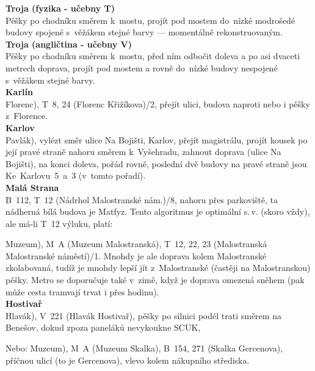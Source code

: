 \textbf{Troja (fyzika - učebny T)}\\
Pěšky po chodníku směrem k~mostu, projít
pod mostem do~nízké modrošedé budovy spojené s~věžákem stejné
barvy --- momentálně rekonstruovaným.
\\
\textbf{Troja (angličtina - učebny V)}\\
Pěšky po chodníku směrem k~mostu, před
ním odbočit doleva a po asi dvaceti metrech doprava, projít pod
mostem a rovně do~nízké budovy nespojené s~věžákem stejné barvy.
\\
\textbf{Karlín}\\
\startpath Florenc), T~8, 24 (Florenc \ra
Křižíkova)/2, přejít ulici, budova naproti nebo i pěšky
z~Florence.\\
\textbf{Karlov} \\
\startpath Pavlák), vylézt směr ulice Na Bojišti,
Karlov, přejít magistrálu, projít kousek po její pravé straně
nahoru směrem k~Vyšehradu, zahnout doprava (ulice Na Bojišti), na
konci doleva, pořád rovně, poslední dvě budovy na pravé straně
jsou Ke~Karlovu~{5~a~3} (v~tomto pořadí).\\
\textbf{Malá Strana}\\
B~112, T~12 (Nádrhol \ra Malostranské
nám.)/8, nahoru přes parkoviště, ta nádherná bílá budova je Matfyz.
Tento algoritmus je optimální s.$\,$v. (skoro vždy), ale má-li
T~12 výluku, platí:

\startpath Muzeum), M~A (Muzeum \ra
Malostranská), T~12, 22, 23 (Malostranská \ra Malostranské
náměstí)/1. Mnohdy je ale doprava kolem Malostranské zkolabovaná,
tudíž je mnohdy lepší jít z~Malostranské (častěji na
Malostranskou) pěšky. Metro se doporučuje také v~zimě, když je
doprava omezená sněhem (pak může cesta tramvají trvat i přes
hodinu).
\\
\textbf {Hostivař} \\
\startpath Hlavák), V~221 (Hlavák \ra
Hostivař), pěšky po silnici podél trati směrem na Benešov, dokud
zpoza paneláků nevykoukne SCUK,

Nebo:  \startpath Muzeum), M~A (Muzeum \ra Skalka), B~154, 271
(Skalka \ra
Gercenova), %
příčnou ulicí (to je Gercenova), vlevo kolem nákupního střediska.

